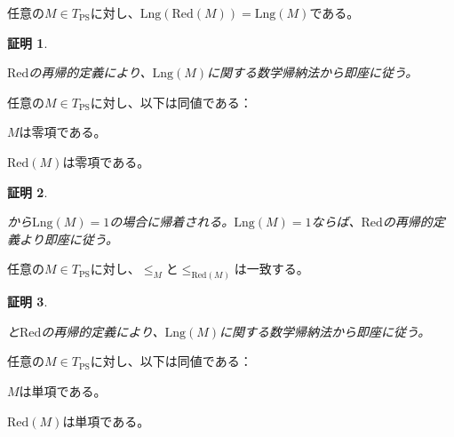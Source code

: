 \documentclass[dvipdfmx,uplatex]{jsarticle}
\theoremstyle{customnonumberbreakfortheorem}
\theoremstyle{customnonumberbreakforproof}
\newtheorem{hideableproof}{証明}
\begin{document}
\begin{proposition}\label{LngのRed不変性}
	任意の\(M \in T_{\textrm{PS}}\)に対し、\(\textrm{Lng}(\textrm{Red}(M)) = \textrm{Lng}(M)\)である。
\end{proposition}

\begin{hideableproof}
	\begin{indented}
		\item \(\textrm{Red}\)の再帰的定義により、\(\textrm{Lng}(M)\)に関する数学帰納法から即座に従う。
	\end{indented}
\end{hideableproof}

\begin{corollary}\label{Redが零項性を保つこと}
	任意の\(M \in T_{\textrm{PS}}\)に対し、以下は同値である：
	\begin{penumerate}
		\item \(M\)は零項である。
		\item \(\textrm{Red}(M)\)は零項である。
	\end{penumerate}
\end{corollary}

\begin{hideableproof}
	\begin{indented}
		\item {}から\(\textrm{Lng}(M) = 1\)の場合に帰着される。\(\textrm{Lng}(M) = 1\)ならば、\(\textrm{Red}\)の再帰的定義より即座に従う。
	\end{indented}
\end{hideableproof}

\begin{corollary}\label{直系先祖のRed不変性}
	任意の\(M \in T_{\textrm{PS}}\)に対し、\(\leq_M\)と\(\leq_{\textrm{Red}(M)}\)は一致する。
\end{corollary}

\begin{hideableproof}
	\begin{indented}
		\item {}と\(\textrm{Red}\)の再帰的定義により、\(\textrm{Lng}(M)\)に関する数学帰納法から即座に従う。
	\end{indented}
\end{hideableproof}

\begin{corollary}\label{Redが単項性を保つこと}
	任意の\(M \in T_{\textrm{PS}}\)に対し、以下は同値である：
	\begin{penumerate}
		\item \(M\)は単項である。
		\item \(\textrm{Red}(M)\)は単項である。
	\end{penumerate}
\end{corollary}
\end{document}
